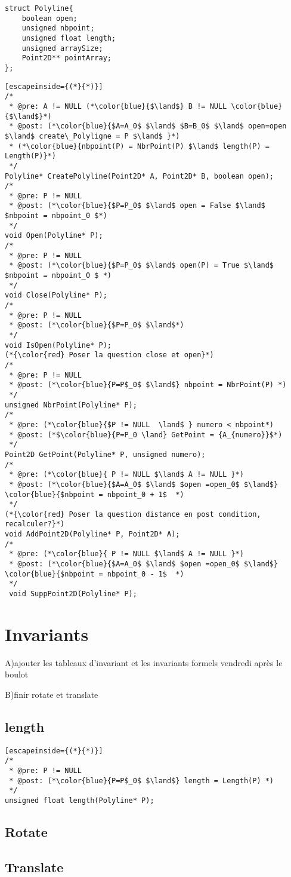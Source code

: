 \documentclass[a4paper, 11pt, oneside]{article}
\begin{document}
\begin{lstlisting}
struct Polyline{
	boolean open;
	unsigned nbpoint;
	unsigned float length;
	unsigned arraySize;
	Point2D** pointArray;
};
\end{lstlisting}

\begin{lstlisting}[escapeinside={(*}{*)}]
/* 
 * @pre: A != NULL (*\color{blue}{$\land$} B != NULL \color{blue}{$\land$}*)
 * @post: (*\color{blue}{$A=A_0$ $\land$ $B=B_0$ $\land$ open=open $\land$ create\_Polyligne = P $\land$ }*)
 * (*\color{blue}{nbpoint(P) = NbrPoint(P) $\land$ length(P) = Length(P)}*)
 */
Polyline* CreatePolyline(Point2D* A, Point2D* B, boolean open);
/* 
 * @pre: P != NULL 
 * @post: (*\color{blue}{$P=P_0$ $\land$ open = False $\land$  $nbpoint = nbpoint_0 $*)
 */
void Open(Polyline* P);
/* 
 * @pre: P != NULL 
 * @post: (*\color{blue}{$P=P_0$ $\land$ open(P) = True $\land$ $nbpoint = nbpoint_0 $ *)
 */
void Close(Polyline* P);
/* 
 * @pre: P != NULL 
 * @post: (*\color{blue}{$P=P_0$ $\land$*)
 */
void IsOpen(Polyline* P);
(*{\color{red} Poser la question close et open}*)
/* 
 * @pre: P != NULL
 * @post: (*\color{blue}{P=P$_0$ $\land$} nbpoint = NbrPoint(P) *)
 */
unsigned NbrPoint(Polyline* P);
/* 
 * @pre: (*\color{blue}{$P != NULL  \land$ } numero < nbpoint*)
 * @post: (*$\color{blue}{P=P_0 \land} GetPoint = {A_{numero}}$*)
 */
Point2D GetPoint(Polyline* P, unsigned numero);
/*
 * @pre: (*\color{blue}{ P != NULL $\land$ A != NULL }*)
 * @post: (*\color{blue}{$A=A_0$ $\land$ $open =open_0$ $\land$} \color{blue}{$nbpoint = nbpoint_0 + 1$  *)
 */
(*{\color{red} Poser la question distance en post condition, recalculer?}*)
void AddPoint2D(Polyline* P, Point2D* A);
/*
 * @pre: (*\color{blue}{ P != NULL $\land$ A != NULL }*)
 * @post: (*\color{blue}{$A=A_0$ $\land$ $open =open_0$ $\land$} \color{blue}{$nbpoint = nbpoint_0 - 1$  *)
 */
 void SuppPoint2D(Polyline* P);
\end{lstlisting}

\section{Invariants}
A)ajouter les tableaux d'invariant et les invariants formels vendredi après le boulot

B)finir rotate et translate
\subsection{length}
\begin{lstlisting}[escapeinside={(*}{*)}]
/* 
 * @pre: P != NULL
 * @post: (*\color{blue}{P=P$_0$ $\land$} length = Length(P) *)
 */
unsigned float length(Polyline* P);
\end{lstlisting}

\subsection{Rotate}


\subsection{Translate}
\end{document}
